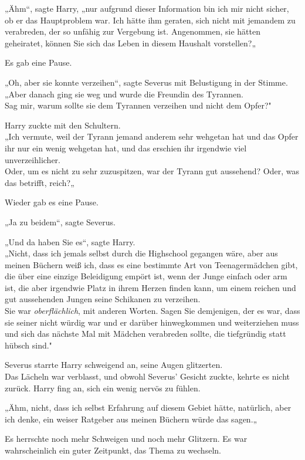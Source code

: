 {„Ähm“, sagte Harry, „nur aufgrund dieser Information bin ich mir nicht sicher, ob er das Hauptproblem war. Ich hätte ihm geraten, sich nicht mit jemandem zu verabreden, der so unfähig zur Vergebung ist. Angenommen, sie hätten geheiratet, können Sie sich das Leben in diesem Haushalt vorstellen?„

Es gab eine Pause.

„Oh, aber sie konnte verzeihen“, sagte Severus mit Belustigung in der Stimme.\\ „Aber danach ging sie weg und wurde die Freundin des Tyrannen.\\ Sag mir, warum sollte sie dem Tyrannen verzeihen und nicht dem Opfer?"

Harry zuckte mit den Schultern.\\ „Ich vermute, weil der Tyrann jemand anderem sehr wehgetan hat und das Opfer ihr nur ein wenig wehgetan hat, und das erschien ihr irgendwie viel unverzeihlicher.\\ Oder, um es nicht zu sehr zuzuspitzen, war der Tyrann gut aussehend? Oder, was das betrifft, reich?„

Wieder gab es eine Pause.

„Ja zu beidem“, sagte Severus.

„Und da haben Sie es“, sagte Harry.\\ „Nicht, dass ich jemals selbst durch die Highschool gegangen wäre, aber aus meinen Büchern weiß ich, dass es eine bestimmte Art von Teenagermädchen gibt, die über eine einzige Beleidigung empört ist, wenn der Junge einfach oder arm ist, die aber irgendwie Platz in ihrem Herzen finden kann, um einem reichen und gut aussehenden Jungen seine Schikanen zu verzeihen.\\ Sie war \emph{oberflächlich}, mit anderen Worten. Sagen Sie demjenigen, der es war, dass sie seiner nicht würdig war und er darüber hinwegkommen und weiterziehen muss und sich das nächste Mal mit Mädchen verabreden sollte, die tiefgründig statt hübsch sind."

Severus starrte Harry schweigend an, seine Augen glitzerten.\\ Das Lächeln war verblasst, und obwohl Severus' Gesicht zuckte, kehrte es nicht zurück. Harry fing an, sich ein wenig nervös zu fühlen.

„Ähm, nicht, dass ich selbst Erfahrung auf diesem Gebiet hätte, natürlich, aber ich denke, ein weiser Ratgeber aus meinen Büchern würde das sagen.„

Es herrschte noch mehr Schweigen und noch mehr Glitzern. Es war wahrscheinlich ein guter Zeitpunkt, das Thema zu wechseln.

}
